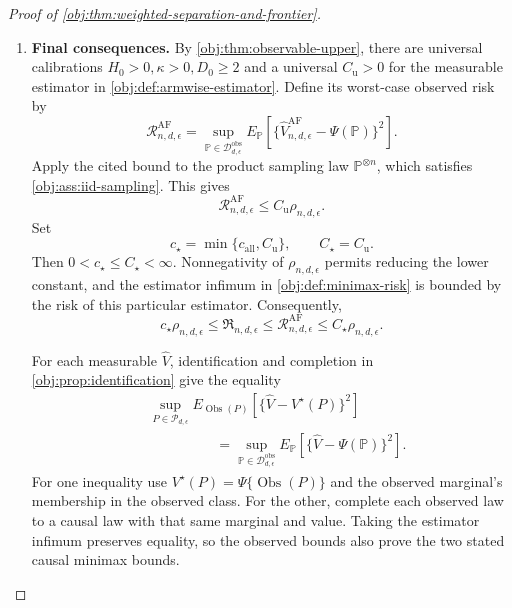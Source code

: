 \begin{proof}[Proof of \cref{obj:thm:weighted-separation-and-frontier}]
\begin{enumerate}
Now define
\[
c_{\mathrm{all}}
=\min\left\{c_{\mathrm{lg}},\frac1{1024D_{\mathrm{lg}}}\right\}>0.
\]
For \(d\ge D_{\mathrm{lg}}\), the large-alphabet bound applies.
For \(2\le d<D_{\mathrm{lg}}\), using \(L_d\ge1\) gives
\[
\rho_{n,d,\epsilon}
\le
D_{\mathrm{lg}}\min\left\{1,\frac1{n\epsilon}\right\}.
\]
Indeed, \(\rho_{n,d,\epsilon}\le1\le D_{\mathrm{lg}}\), and
\[
\rho_{n,d,\epsilon}
\le\frac d{n\epsilon L_d}
\le\frac{D_{\mathrm{lg}}}{n\epsilon}.
\]
Thus in this second case,
\[
c_{\mathrm{all}}\rho_{n,d,\epsilon}
\le
\frac1{1024}\min\left\{1,\frac1{n\epsilon}\right\}
\le\mathfrak R_{n,d,\epsilon}.
\]
Together the two cases establish
\[
c_{\mathrm{all}}\rho_{n,d,\epsilon}
\le\mathfrak R_{n,d,\epsilon}
\qquad(n\ge1,\ d\ge2,\ 0<\epsilon\le1/2).
\]

\item
\textbf{Final consequences.}\quad
By \cref{obj:thm:observable-upper}, there are universal calibrations
\(H_0>0,\kappa>0,D_0\ge2\) and a universal \(C_{\mathrm u}>0\) for the measurable estimator in
\cref{obj:def:armwise-estimator}. Define its worst-case observed risk by
\[
\mathcal R^{\mathrm{AF}}_{n,d,\epsilon}
=
\sup_{\mathbb P\in\mathcal D_{d,\epsilon}^{\mathrm{obs}}}
E_{\mathbb P}
\left[
\{\widehat V_{n,d,\epsilon}^{\mathrm{AF}}-\Psi(\mathbb P)\}^2
\right].
\]
Apply the cited bound to the product sampling law
\(\mathbb P^{\otimes n}\), which satisfies
\cref{obj:ass:iid-sampling}. This gives
\[
\mathcal R^{\mathrm{AF}}_{n,d,\epsilon}
\le C_{\mathrm u}\rho_{n,d,\epsilon}.
\]
Set
\[
c_\star=\min\{c_{\mathrm{all}},C_{\mathrm u}\},
\qquad
C_\star=C_{\mathrm u}.
\]
Then \(0<c_\star\le C_\star<\infty\). Nonnegativity of
\(\rho_{n,d,\epsilon}\) permits reducing the lower constant, and the estimator infimum in
\cref{obj:def:minimax-risk} is bounded by the risk of this particular estimator. Consequently,
\[
c_\star\rho_{n,d,\epsilon}
\le\mathfrak R_{n,d,\epsilon}
\le\mathcal R^{\mathrm{AF}}_{n,d,\epsilon}
\le C_\star\rho_{n,d,\epsilon}.
\]

For each measurable \(\widehat V\), identification and completion in
\cref{obj:prop:identification} give the equality
\[
\begin{aligned}
&\sup_{P\in\mathcal P_{d,\epsilon}}
E_{\operatorname{Obs}(P)}
[\{\widehat V-V^\star(P)\}^2]\\
&\hspace{2cm}=
\sup_{\mathbb P\in\mathcal D_{d,\epsilon}^{\mathrm{obs}}}
E_{\mathbb P}
[\{\widehat V-\Psi(\mathbb P)\}^2].
\end{aligned}
\]
For one inequality use
\(V^\star(P)=\Psi\{\operatorname{Obs}(P)\}\) and the observed marginal's membership in the observed class. For the other, complete each observed law to a causal law with that same marginal and value. Taking the estimator infimum preserves equality, so the observed bounds also prove the two stated causal minimax bounds.


\end{enumerate}
\end{proof}
